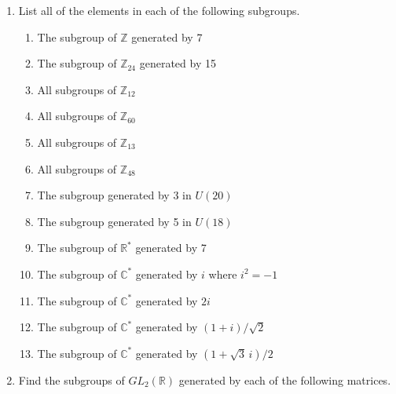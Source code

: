 {\begin{enumerate}
\begin{multicols}{3}
\begin{enumerate}
 \end{enumerate}
 \end{multicols}
  
\item
List all of the elements in each of the following subgroups.
\begin{enumerate}
 
 \item
The subgroup of ${\mathbb Z}$ generated by 7
 
 \item
The subgroup of ${\mathbb Z}_{24}$ generated by 15
 
 \item
All subgroups of ${\mathbb Z}_{12}$
 
 \item
All subgroups of ${\mathbb Z}_{60}$
 
 \item
All subgroups of ${\mathbb Z}_{13}$
 
 \item
All subgroups of ${\mathbb Z}_{48}$
 
 \item
The subgroup generated by 3  in $U(20)$
 
 \item
The subgroup generated by 5 in $U(18)$  %
 
 \item
The subgroup of ${\mathbb R}^\ast$ generated by 7
 
 \item
The subgroup of ${\mathbb C}^\ast$ generated by $i$ where $i^2 = -1$
 
 \item
The subgroup of ${\mathbb C}^\ast$ generated by $2i$
 
 \item
The subgroup of ${\mathbb C}^\ast$ generated by $(1 + i) / \sqrt{2}$
 
 \item
The subgroup of ${\mathbb C}^\ast$ generated by $(1 + \sqrt{3}\, i) / 2$
 
\end{enumerate}
 
 
\item
Find the subgroups of $GL_2( {\mathbb R })$ generated by each of the
following matrices. 
\begin{multicols}{3}
\begin{enumerate}
 

\end{enumerate}
\end{multicols}
\end{enumerate}}
